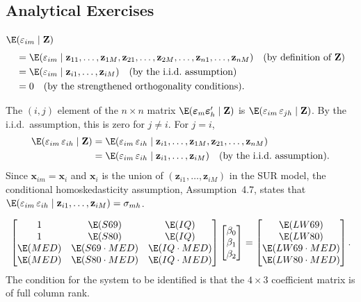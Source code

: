 \begin{answers}

\subsection*{Analytical Exercises}

$\E(\varepsilon_{im} \mid \mathbf{Z})$
\begin{align*}
&= \E(\varepsilon_{im} \mid \mathbf{z}_{11}, \ldots, \mathbf{z}_{1M},
\mathbf{z}_{21}, \ldots, \mathbf{z}_{2M}, \ldots, \mathbf{z}_{n1}, \ldots, \mathbf{z}_{nM})
\quad \text{(by definition of $\mathbf{Z}$)} \\
&= \E(\varepsilon_{im} \mid \mathbf{z}_{i1}, \ldots, \mathbf{z}_{iM})
\quad \text{(by the i.i.d.\ assumption)} \\
&= 0 \quad \text{(by the strengthened orthogonality conditions).}
\end{align*}

The $(i, j)$ element of the $n \times n$ matrix
$\E(\boldsymbol{\varepsilon}_m \boldsymbol{\varepsilon}_h' \mid \mathbf{Z})$
is $\E(\varepsilon_{im}\, \varepsilon_{jh} \mid \mathbf{Z})$.
By the i.i.d.\ assumption, this is zero for $j \neq i$. For $j = i$,
\begin{align*}
\E(\varepsilon_{im}\, \varepsilon_{ih} \mid \mathbf{Z})
&= \E(\varepsilon_{im}\, \varepsilon_{ih} \mid
\mathbf{z}_{i1}, \ldots, \mathbf{z}_{1M}, \mathbf{z}_{21}, \ldots, \mathbf{z}_{nM}) \\
&= \E(\varepsilon_{im}\, \varepsilon_{ih} \mid \mathbf{z}_{i1}, \ldots, \mathbf{z}_{iM})
\quad \text{(by the i.i.d.\ assumption).}
\end{align*}
Since $\mathbf{x}_{im} = \mathbf{x}_i$ and $\mathbf{x}_i$ is the union of
$(\mathbf{z}_{i1}, \ldots, \mathbf{z}_{iM})$ in the SUR model, the conditional
homoskedasticity assumption, Assumption~4.7, states that
$\E(\varepsilon_{im}\, \varepsilon_{ih} \mid \mathbf{z}_{i1}, \ldots, \mathbf{z}_{iM})
= \sigma_{mh}$.

\[
\begin{bmatrix}
1 & \E(S69) & \E(IQ) \\
1 & \E(S80) & \E(IQ) \\
\E(MED) & \E(S69 \cdot MED) & \E(IQ \cdot MED) \\
\E(MED) & \E(S80 \cdot MED) & \E(IQ \cdot MED)
\end{bmatrix}
\begin{bmatrix} \beta_0 \\ \beta_1 \\ \beta_2 \end{bmatrix}
= \begin{bmatrix}
\E(LW69) \\ \E(LW80) \\ \E(LW69 \cdot MED) \\ \E(LW80 \cdot MED)
\end{bmatrix}.
\]
The condition for the system to be identified is that the $4 \times 3$ coefficient matrix
is of full column rank.


\end{answers}
